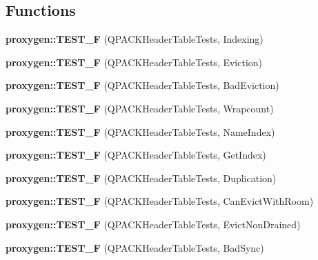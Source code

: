 \subsection*{Functions}
\begin{DoxyCompactItemize}
\item 
{\bf proxygen\+::\+T\+E\+S\+T\+\_\+F} (Q\+P\+A\+C\+K\+Header\+Table\+Tests, Indexing)
\item 
{\bf proxygen\+::\+T\+E\+S\+T\+\_\+F} (Q\+P\+A\+C\+K\+Header\+Table\+Tests, Eviction)
\item 
{\bf proxygen\+::\+T\+E\+S\+T\+\_\+F} (Q\+P\+A\+C\+K\+Header\+Table\+Tests, Bad\+Eviction)
\item 
{\bf proxygen\+::\+T\+E\+S\+T\+\_\+F} (Q\+P\+A\+C\+K\+Header\+Table\+Tests, Wrapcount)
\item 
{\bf proxygen\+::\+T\+E\+S\+T\+\_\+F} (Q\+P\+A\+C\+K\+Header\+Table\+Tests, Name\+Index)
\item 
{\bf proxygen\+::\+T\+E\+S\+T\+\_\+F} (Q\+P\+A\+C\+K\+Header\+Table\+Tests, Get\+Index)
\item 
{\bf proxygen\+::\+T\+E\+S\+T\+\_\+F} (Q\+P\+A\+C\+K\+Header\+Table\+Tests, Duplication)
\item 
{\bf proxygen\+::\+T\+E\+S\+T\+\_\+F} (Q\+P\+A\+C\+K\+Header\+Table\+Tests, Can\+Evict\+With\+Room)
\item 
{\bf proxygen\+::\+T\+E\+S\+T\+\_\+F} (Q\+P\+A\+C\+K\+Header\+Table\+Tests, Evict\+Non\+Drained)
\item 
{\bf proxygen\+::\+T\+E\+S\+T\+\_\+F} (Q\+P\+A\+C\+K\+Header\+Table\+Tests, Bad\+Sync)
\end{DoxyCompactItemize}
